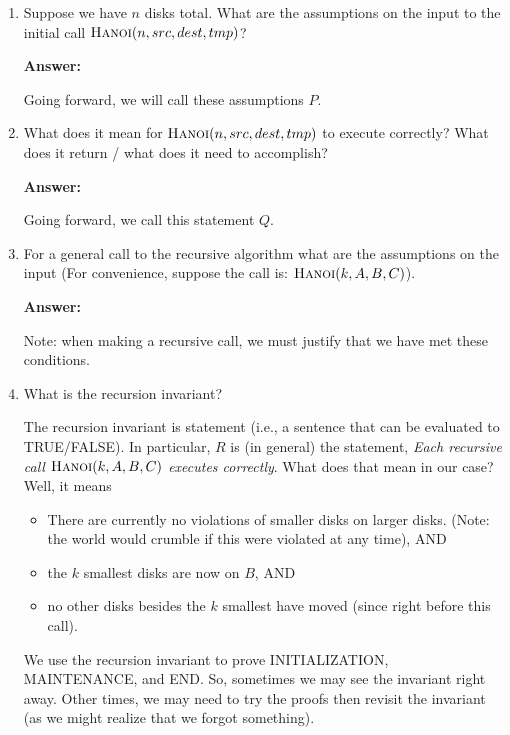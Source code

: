 \documentclass{article}
\newcommand{\answer}{\textbf{Answer:}\vspace{1.8in}}
\begin{document}
\begin{enumerate}
    \item Suppose we have $n$ disks total. What are the assumptions on the input
        to the initial call $\textsc{Hanoi}(n,src,dest,tmp)$?

        \answer

        Going forward, we will call these assumptions $P$.

    \pagebreak
    \item What does it mean for $\textsc{Hanoi}(n,src,dest,tmp)$ to execute
        correctly? What does it return / what does it need to accomplish?

        \answer

        Going forward, we call this statement $Q$.

    \item For a general call to the recursive algorithm what are the assumptions on the input
        (For convenience, suppose the call is: $\textsc{Hanoi}(k,A,B,C)$).

        \answer

        Note: when making a recursive call, we must justify that we have met
        these conditions.

    \item What is the recursion invariant?

        The recursion invariant is statement (i.e., a sentence that can be
        evaluated to TRUE/FALSE).
        In particular, $R$ is (in general) the statement,
        \emph{Each recursive call $\textsc{Hanoi}(k,A,B,C)$ executes
        correctly}.  What does that mean in our case?  Well, it means
        \begin{itemize}
            \item There are currently no violations of smaller disks on larger
                disks. (Note: the world would crumble if this were violated at
                any time), AND
            \item the $k$ smallest disks are now on $B$, AND
            \item no other disks besides the $k$ smallest have moved (since
                right before this call).
        \end{itemize}

        We use the recursion invariant to prove INITIALIZATION, MAINTENANCE, and
        END.  So, sometimes we may see the invariant right away.  Other times,
        we may need to try the proofs then revisit the invariant (as we might
        realize that we forgot something).


\end{enumerate}
\end{document}
